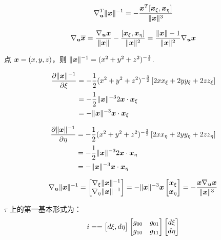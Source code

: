 \documentclass{article}
\begin{document}
\begin{align*}
    \nabla_{\boldsymbol u}^T \|{\boldsymbol x}\|^{-1} = -\frac{{\boldsymbol x}^T[{\boldsymbol x}_\xi, {\boldsymbol x}_\eta]}{\|{\boldsymbol x}\|^3} 
\end{align*}

\begin{align*}
    \nabla_{\boldsymbol u} \overline{{\boldsymbol x}} = \frac{\nabla_{\boldsymbol u}{\boldsymbol x}}{\|{\boldsymbol x}\|} - 
    \frac{[{\boldsymbol x}_\xi, {\boldsymbol x}_\eta]}{\|{\boldsymbol x}\|^2} = \frac{\|{\boldsymbol x}\| -
    1}{\|{\boldsymbol x}\|^2}\nabla_{\boldsymbol u}{\boldsymbol x}
\end{align*}

点 ${\boldsymbol x}=(x,y,z)$，则 $\|{\boldsymbol x}\|^{-1}=(x^2+y^2+z^2)^{-\frac{1}{2}}$.

\begin{align*}
    \frac{\partial \|{\boldsymbol x}\|^{-1}}{\partial \xi} &=
    -\frac{1}{2}(x^2+y^2+z^2)^{-\frac{3}{2}}\left[2x x_\xi + 2y y_\xi +2z
    z_\xi\right]\\
                             &=  -\frac{1}{2}\|{\boldsymbol x}\|^{-3} 2{\boldsymbol x} \cdot {\boldsymbol x}_\xi\\
                             &=  -\|{\boldsymbol x}\|^{-3} {\boldsymbol x}\cdot {\boldsymbol x}_\xi
\end{align*}

\begin{align*}
    \frac{\partial \|{\boldsymbol x}\|^{-1}}{\partial \eta} &=
    -\frac{1}{2}(x^2+y^2+z^2)^{-\frac{3}{2}}\left[2x x_\eta + 2y y_\eta +2z
    z_\eta\right]\\
                             &=  -\frac{1}{2}\|{\boldsymbol x}\|^{-3} 2{\boldsymbol x}\cdot{\boldsymbol x}_\eta\\
                             &=  -\|{\boldsymbol x}\|^{-3} {\boldsymbol x}\cdot {\boldsymbol x}_\eta
\end{align*}

\begin{align*}
    \nabla_{\boldsymbol u} \|{\boldsymbol x}\|^{-1} =    
    \begin{bmatrix}
     \nabla_\xi \|{\boldsymbol x}\|^{-1} \\ \nabla_\eta \|{\boldsymbol x}\|^{-1}
    \end{bmatrix}
                             =  -\|{\boldsymbol x}\|^{-3} {\boldsymbol x} 
    \begin{bmatrix}
      {\boldsymbol x}_\xi \\ {\boldsymbol x}_\eta
    \end{bmatrix}
    =-\frac{{\boldsymbol x} \nabla_{\boldsymbol u} {\boldsymbol x}}{\|{\boldsymbol x}\|^3}
\end{align*}

$\tau$ 上的第一基本形式为：
\begin{align*}
    \uppercase\expandafter{\romannumeral1} =  = 
    \begin{bmatrix}
        d\xi , d\eta
    \end{bmatrix}
     \begin{bmatrix}
        g_{00} & g_{01} \\
        g_{10} & g_{11} 
    \end{bmatrix}   
    \begin{bmatrix}
        d\xi \\ d\eta
    \end{bmatrix}
\end{align*}
\end{document}
